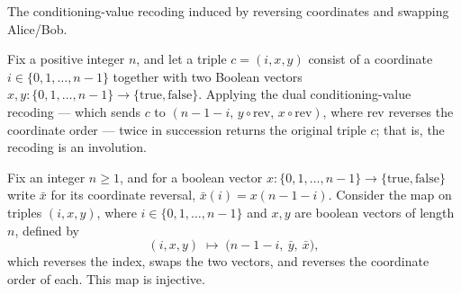 \begin{definition}[Dualconditioningvalue]
\label{CommunicationComplexity.Functions.Disjointness.RandomizedLowerBound.dualConditioningValue}
\leanok
{}
The conditioning-value recoding induced by reversing coordinates and swapping Alice/Bob.
\end{definition}

\begin{theorem}
\label{CommunicationComplexity.Functions.Disjointness.RandomizedLowerBound.dualConditioningValue_dualConditioningValue}
\leanok
{}
Fix a positive integer $n$, and let a triple $c = (i, x, y)$ consist of a coordinate $i
\in \{0, 1, \dots, n-1\}$ together with two Boolean vectors $x, y \colon \{0, 1, \dots,
n-1\} \to \{\text{true}, \text{false}\}$. Applying the dual conditioning-value recoding
— which sends $c$ to $(n-1-i,\, y \circ \mathrm{rev},\, x \circ \mathrm{rev})$, where
$\mathrm{rev}$ reverses the coordinate order — twice in succession returns the original
triple $c$; that is, the recoding is an involution.
\end{theorem}

\begin{theorem}
\label{CommunicationComplexity.Functions.Disjointness.RandomizedLowerBound.dualConditioningValue_injective}
\leanok
{}
Fix an integer $n \ge 1$, and for a boolean vector $x \colon \{0,1,\dots,n-1\} \to
\{\text{true},\text{false}\}$ write $\bar x$ for its coordinate reversal, $\bar x(i) =
x(n-1-i)$. Consider the map on triples $(i, x, y)$, where $i \in \{0,1,\dots,n-1\}$ and
$x, y$ are boolean vectors of length $n$, defined by
\[
  (i, x, y) \;\longmapsto\; \bigl(n-1-i,\ \bar y,\ \bar x\bigr),
\]
which reverses the index, swaps the two vectors, and reverses the coordinate order of
each. This map is injective.
\end{theorem}

